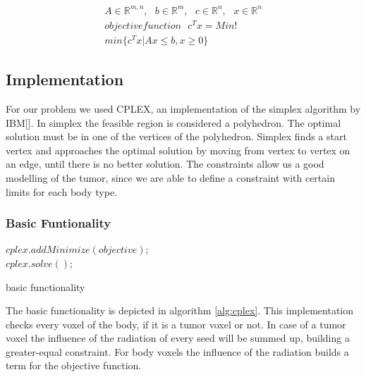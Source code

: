 \documentclass[12pt]{article}
\begin{document}
 \begin{equation}
 \label{eq:LPMatrix}
 \begin{aligned}
 A \in \mathbb{R}^{m,n}, \ \ \ b \in \mathbb{R}^m, \ \ \ c \in \mathbb{R}^n, \ \ \ x \in \mathbb{R}^n \\
 objective function \ \ \ c^Tx = Min! \\
 min\{c^Tx|Ax \leq b, x \geq 0\}
\end{aligned}
 \end{equation}
 
 
 
 \subsection{Implementation}
 
For our problem we used CPLEX, an implementation of the simplex algorithm by IBM[\cite{cplex}]. In simplex the feasible region is considered a polyhedron. The optimal solution must be in one of the vertices of the polyhedron. Simplex finds a start vertex and approaches the optimal solution by moving from vertex to vertex on an edge, until there is no better solution.
The constraints allow us a good modelling of the tumor, since we are able to define a constraint with certain limits for each body type.

\subsubsection{Basic Funtionality}

\begin{algorithm}[H]
\label{alg:cplex}
  $cplex.addMinimize(objective);$\\
  $cplex.solve();$
 \caption{basic functionality}
 \end{algorithm}

The basic functionality is depicted in algorithm \ref{alg:cplex}. This implementation checks every voxel of the body, if it is a tumor voxel or not. In case of a tumor voxel the influence of the radiation of every seed will be summed up, building a greater-equal constraint. For body voxels the influence of the radiation builds a term for the objective function. 
\end{document}
